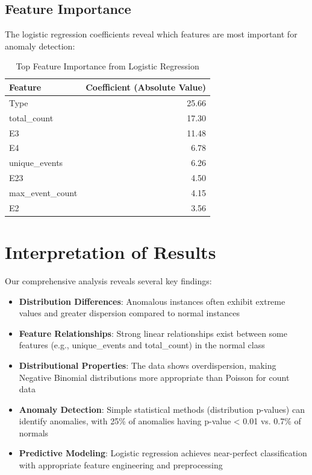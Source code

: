 \documentclass[12pt,a4paper]{article}
\theoremstyle{definition}
\theoremstyle{remark}
\begin{document}
\subsection{Feature Importance}
The logistic regression coefficients reveal which features are most important for anomaly detection:

\begin{table}[H]
\centering
\caption{Top Feature Importance from Logistic Regression}
\begin{tabular}{lr}
\toprule
\textbf{Feature} & \textbf{Coefficient (Absolute Value)} \\
\midrule
Type & 25.66 \\
total\_count & 17.30 \\
E3 & 11.48 \\
E4 & 6.78 \\
unique\_events & 6.26 \\
E23 & 4.50 \\
max\_event\_count & 4.15 \\
E2 & 3.56 \\
\bottomrule
\end{tabular}
\end{table}

\section{Interpretation of Results}

Our comprehensive analysis reveals several key findings:

\begin{itemize}
    \item \textbf{Distribution Differences}: Anomalous instances often exhibit extreme values and greater dispersion compared to normal instances
    \item \textbf{Feature Relationships}: Strong linear relationships exist between some features (e.g., unique\_events and total\_count) in the normal class
    \item \textbf{Distributional Properties}: The data shows overdispersion, making Negative Binomial distributions more appropriate than Poisson for count data
    \item \textbf{Anomaly Detection}: Simple statistical methods (distribution p-values) can identify anomalies, with 25\% of anomalies having p-value < 0.01 vs. 0.7\% of normals
    \item \textbf{Predictive Modeling}: Logistic regression achieves near-perfect classification with appropriate feature engineering and preprocessing
\end{itemize}
\end{document}
